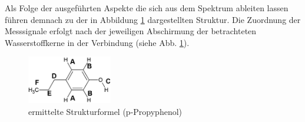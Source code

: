  Als Folge der ausgeführten Aspekte die sich aus dem Spektrum ableiten lassen führen demnach zu der in Abbildung \ref{fig:struktur_linear} dargestellten Struktur. Die Zuordnung der Messsignale erfolgt nach der jeweiligen Abschirmung der betrachteten Wasserstoffkerne in der Verbindung (siehe Abb. \ref{fig:struktur_linear}).
 
\begin{figure}[h!]
	\centering
	\includegraphics[width=0.33\textwidth]{img/struktur_linear_b.png}
	\caption{ermittelte Strukturformel (p-Propyphenol)}
	\label{fig:struktur_linear}
\end{figure}
\FloatBarrier

